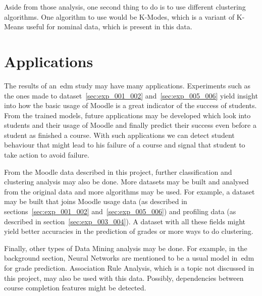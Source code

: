 Aside from those analysis, one second thing to do is to use different
clustering algorithms. One algorithm to use would be K-Modes, which is a
variant of K-Means useful for nominal data, which is present in this data.

\section{Applications}

The results of an~\gls{edm} study may have many applications. Experiments such
as the ones made to dataset~\ref{sec:exp_001_002} and~\ref{sec:exp_005_006}
yield insight into how the basic usage of Moodle is a great indicator of the
success of students. From the trained models, future applications may be
developed which look into students and their usage of Moodle and finally
predict their success even before a student as finished a course. With such
applications we can detect student behaviour that might lead to his failure of
a course and signal that student to take action to avoid failure.

From the Moodle data described in this project, further classification and
clustering analysis may also be done. More datasets may be built and analysed
from the original data and more algorithms may be used. For example, a dataset
may be built that joins Moodle usage data (as described in
sections~\ref{sec:exp_001_002} and~\ref{sec:exp_005_006}) and profiling data
(as described in section~\ref{sec:exp_003_004}). A dataset with all these
fields might yield better accuracies in the prediction of grades or more ways
to do clustering.

Finally, other types of Data Mining analysis may be done. For example, in the
background section, Neural Networks are mentioned to be a usual model
in~\gls{edm} for grade prediction. Association Rule Analysis, which is a topic
not discussed in this project, may also be used with this data. Possibly,
dependencies between course completion features might be detected.
